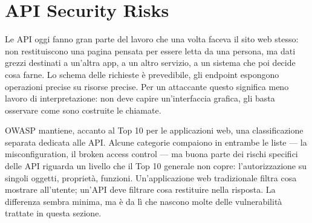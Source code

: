 \section{API Security Risks}
\label{sec:api_security_risks}

Le API oggi fanno gran parte del lavoro che una volta faceva il sito web
stesso: non restituiscono una pagina pensata per essere letta da una
persona, ma dati grezzi destinati a un'altra app, a un altro servizio, a un
sistema che poi decide cosa farne. Lo schema delle richieste è prevedibile,
gli endpoint espongono operazioni precise su risorse precise. Per un
attaccante questo significa meno lavoro di interpretazione: non deve capire
un'interfaccia grafica, gli basta osservare come sono costruite le chiamate.

OWASP mantiene, accanto al Top 10 per le applicazioni web, una
classificazione separata dedicata alle API. Alcune categorie compaiono in
entrambe le liste — la misconfiguration, il broken access control — ma buona
parte dei rischi specifici delle API riguarda un livello che il Top 10
generale non copre: l'autorizzazione su singoli oggetti, proprietà,
funzioni. Un'applicazione web tradizionale filtra cosa mostrare all'utente;
un'API deve filtrare cosa restituire nella risposta. La differenza sembra
minima, ma è da lì che nascono molte delle vulnerabilità trattate in
questa sezione.

